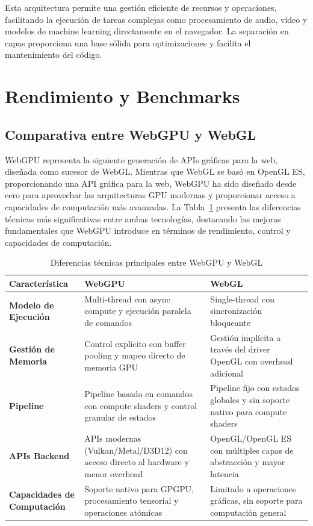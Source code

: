 Esta arquitectura permite una gestión eficiente de recursos y operaciones, facilitando la ejecución de tareas complejas como procesamiento de audio, video y modelos de machine learning directamente en el navegador. La separación en capas proporciona una base sólida para optimizaciones y facilita el mantenimiento del código.

\section{Rendimiento y Benchmarks}

\subsection{Comparativa entre WebGPU y WebGL}

WebGPU representa la siguiente generación de APIs gráficas para la web, diseñada como sucesor de WebGL. Mientras que WebGL se basó en OpenGL ES, proporcionando una API gráfica para la web, WebGPU ha sido diseñado desde cero para aprovechar las arquitecturas GPU modernas y proporcionar acceso a capacidades de computación más avanzadas. La Tabla~\ref{tab:webgpu-webgl} presenta las diferencias técnicas más significativas entre ambas tecnologías, destacando las mejoras fundamentales que WebGPU introduce en términos de rendimiento, control y capacidades de computación.

\label{sec:webgpu-webgl-comparison}

\begin{table}[H]
\caption{Diferencias técnicas principales entre WebGPU y WebGL}
\label{tab:webgpu-webgl}
\begin{tabular}{|p{3cm}|p{5cm}|p{5cm}|}
\hline
\textbf{Característica} & \textbf{WebGPU} & \textbf{WebGL} \\
\hline
\textbf{Modelo de Ejecución} & 
Multi-thread con async compute y ejecución paralela de comandos & 
Single-thread con sincronización bloqueante \\
\hline
\textbf{Gestión de Memoria} & 
Control explícito con buffer pooling y mapeo directo de memoria GPU & 
Gestión implícita a través del driver OpenGL con overhead adicional \\
\hline
\textbf{Pipeline} & 
Pipeline basado en comandos con compute shaders y control granular de estados & 
Pipeline fijo con estados globales y sin soporte nativo para compute shaders \\
\hline
\textbf{APIs Backend} & 
APIs modernas (Vulkan/Metal/D3D12) con acceso directo al hardware y menor overhead & 
OpenGL/OpenGL ES con múltiples capas de abstracción y mayor latencia \\
\hline
\textbf{Capacidades de Computación} & 
Soporte nativo para GPGPU, procesamiento tensorial y operaciones atómicas & 
Limitado a operaciones gráficas, sin soporte para computación general \\
\hline
\end{tabular}
\end{table}

